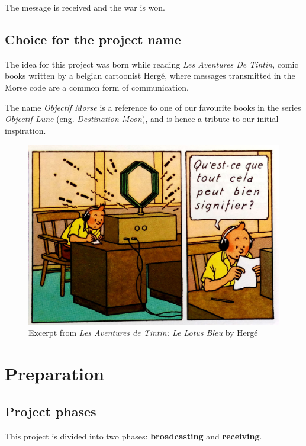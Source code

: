 \documentclass[10pt]{report}
\begin{document}
The message is received and the war is won.

\subsection{Choice for the project name}

The idea for this project was born while reading \textit{Les Aventures De Tintin}, comic books written by a belgian cartoonist Hergé, where messages transmitted in the Morse code are a common form of communication. 

The name \textit{Objectif Morse} is a reference to one of our favourite books in the series \textit{Objectif Lune} \cite{objectif_lune} (eng. \textit{Destination Moon}), and is hence a tribute to our initial inspiration.

\begin{figure}[H]
\centering\includegraphics[scale=0.1]{le_lotus_bleu}
\caption{Excerpt from \textit{Les Aventures de Tintin: Le Lotus Bleu} by Hergé \cite{le_lotus_bleu}}			
\label{fig:tintin}
\end{figure}

\section{Preparation} \label{sec:equip}

\subsection{Project phases}

This project is divided into two phases: \textbf{broadcasting} and \textbf{receiving}. 
\end{document}
